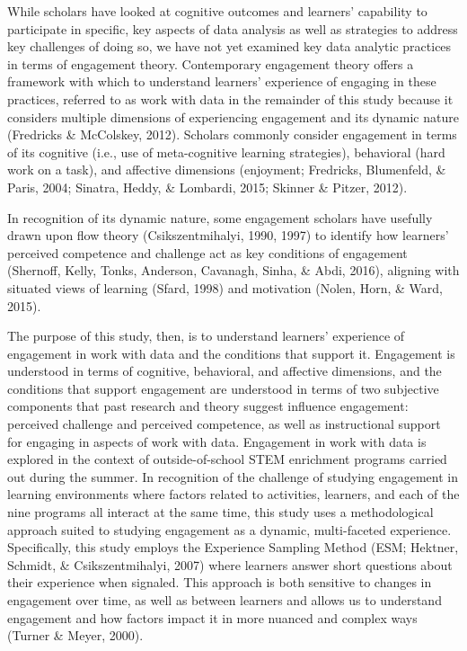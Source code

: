 \documentclass[]{msu-thesis}
\theoremstyle{definition}
\theoremstyle{definition}
\theoremstyle{definition}
\theoremstyle{remark}
\begin{document}
While scholars have looked at cognitive outcomes and learners'
capability to participate in specific, key aspects of data analysis as
well as strategies to address key challenges of doing so, we have not
yet examined key data analytic practices in terms of engagement theory.
Contemporary engagement theory offers a framework with which to
understand learners' experience of engaging in these practices, referred
to as work with data in the remainder of this study because it considers
multiple dimensions of experiencing engagement and its dynamic nature
(Fredricks \& McColskey, 2012). Scholars commonly consider engagement in
terms of its cognitive (i.e., use of meta-cognitive learning
strategies), behavioral (hard work on a task), and affective dimensions
(enjoyment; Fredricks, Blumenfeld, \& Paris, 2004; Sinatra, Heddy, \&
Lombardi, 2015; Skinner \& Pitzer, 2012).

In recognition of its dynamic nature, some engagement scholars have
usefully drawn upon flow theory (Csikszentmihalyi, 1990, 1997) to
identify how learners' perceived competence and challenge act as key
conditions of engagement (Shernoff, Kelly, Tonks, Anderson, Cavanagh,
Sinha, \& Abdi, 2016), aligning with situated views of learning (Sfard,
1998) and motivation (Nolen, Horn, \& Ward, 2015).

The purpose of this study, then, is to understand learners' experience
of engagement in work with data and the conditions that support it.
Engagement is understood in terms of cognitive, behavioral, and
affective dimensions, and the conditions that support engagement are
understood in terms of two subjective components that past research and
theory suggest influence engagement: perceived challenge and perceived
competence, as well as instructional support for engaging in aspects of
work with data. Engagement in work with data is explored in the context
of outside-of-school STEM enrichment programs carried out during the
summer. In recognition of the challenge of studying engagement in
learning environments where factors related to activities, learners, and
each of the nine programs all interact at the same time, this study uses
a methodological approach suited to studying engagement as a dynamic,
multi-faceted experience. Specifically, this study employs the
Experience Sampling Method (ESM; Hektner, Schmidt, \& Csikszentmihalyi,
2007) where learners answer short questions about their experience when
signaled. This approach is both sensitive to changes in engagement over
time, as well as between learners and allows us to understand engagement
and how factors impact it in more nuanced and complex ways (Turner \&
Meyer, 2000).
\end{document}
